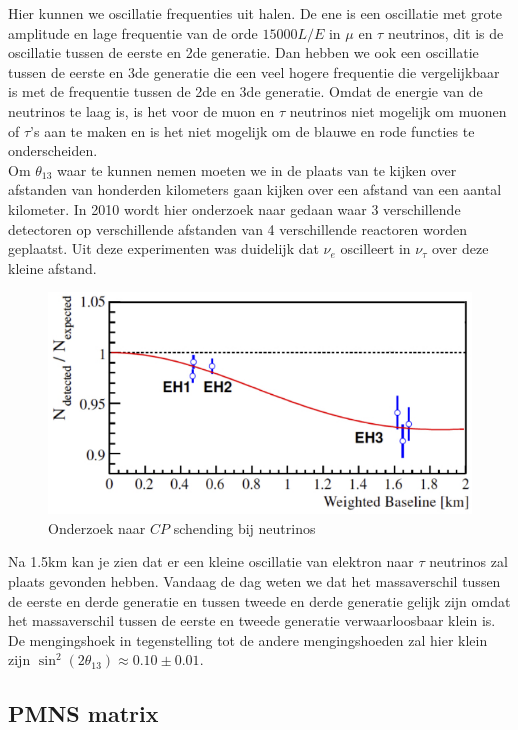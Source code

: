 \documentclass[../main.tex]{subfiles}
\begin{document}
Hier kunnen we oscillatie frequenties uit halen. De ene is een oscillatie met grote amplitude en lage frequentie van de orde $15000L/E$ in $\mu$ en $\tau$ neutrinos, dit is de oscillatie tussen de eerste en 2de generatie. Dan hebben we ook een oscillatie tussen de eerste en 3de generatie die een veel hogere frequentie die vergelijkbaar is met de frequentie tussen de 2de en 3de generatie. Omdat de energie van de neutrinos te laag is, is het voor de muon en $\tau$ neutrinos niet mogelijk om muonen of $\tau$'s aan te maken en is het niet mogelijk om de blauwe en rode functies te onderscheiden.\\
Om $\theta_{13}$ waar te kunnen nemen moeten we in de plaats van te kijken over afstanden van honderden kilometers gaan kijken over een afstand van een aantal kilometer. In 2010 wordt hier onderzoek naar gedaan waar 3 verschillende detectoren op verschillende afstanden van 4 verschillende reactoren worden geplaatst. Uit deze experimenten was duidelijk dat $\nu_e$ oscilleert in $\nu_\tau$ over deze kleine afstand. 

\begin{figure}[h]
    \centering
    \includegraphics[width=0.6\linewidth]{neutrinos/1_3_oscillatie.png}
    \caption{Onderzoek naar $CP$ schending bij neutrinos}%
    \label{fig:neutrinos/1_3_oscillatie}
\end{figure}

Na 1.5km kan je zien dat er een kleine oscillatie van elektron naar $\tau$ neutrinos zal plaats gevonden hebben. Vandaag de dag weten we dat het massaverschil tussen de eerste en derde generatie en tussen tweede en derde generatie gelijk zijn omdat het massaverschil tussen de eerste en tweede generatie verwaarloosbaar klein is. De mengingshoek in tegenstelling tot de andere mengingshoeden zal hier klein zijn $\sin ^{2}\left(2 \theta_{13}\right) \approx 0.10 \pm 0.01$.

\subsection{PMNS matrix}%
\label{sub:pmns_matrix}
\end{document}
